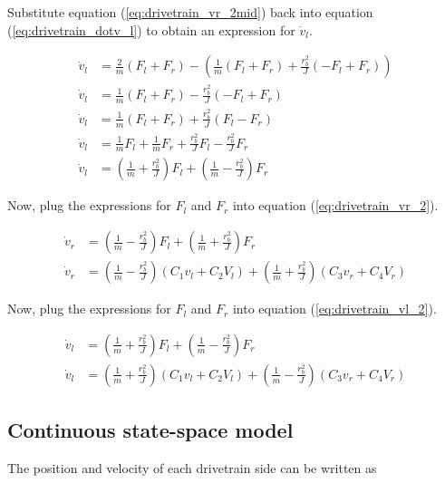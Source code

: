 Substitute equation (\ref{eq:drivetrain_vr_2mid}) back into equation
(\ref{eq:drivetrain_dotv_l}) to obtain an expression for $\dot{v}_l$.

\begin{align}
  \dot{v}_l &= \frac{2}{m} (F_l + F_r) - \left(\frac{1}{m} (F_l + F_r) +
    \frac{r_b^2}{J} (-F_l + F_r)\right) \nonumber \\
  \dot{v}_l &= \frac{1}{m} (F_l + F_r) - \frac{r_b^2}{J} (-F_l + F_r)
    \nonumber \\
  \dot{v}_l &= \frac{1}{m} (F_l + F_r) + \frac{r_b^2}{J} (F_l - F_r) \nonumber
    \\
  \dot{v}_l &= \frac{1}{m} F_l + \frac{1}{m} F_r + \frac{r_b^2}{J} F_l -
    \frac{r_b^2}{J} F_r \nonumber \\
  \dot{v}_l &= \left(\frac{1}{m} + \frac{r_b^2}{J}\right) F_l +
    \left(\frac{1}{m} - \frac{r_b^2}{J}\right) F_r \label{eq:drivetrain_vl_2}
\end{align}

Now, plug the expressions for $F_l$ and $F_r$ into equation
(\ref{eq:drivetrain_vr_2}).

\begin{align}
  \dot{v}_r &= \left(\frac{1}{m} - \frac{r_b^2}{J}\right) F_l +
    \left(\frac{1}{m} + \frac{r_b^2}{J}\right) F_r \nonumber \\
  \dot{v}_r &= \left(\frac{1}{m} - \frac{r_b^2}{J}\right)
    \left(C_1 v_l + C_2 V_l\right) +
    \left(\frac{1}{m} + \frac{r_b^2}{J}\right) \left(C_3 v_r + C_4 V_r\right)
    \label{eq:drivetrain_model_left}
\end{align}

Now, plug the expressions for $F_l$ and $F_r$ into equation
(\ref{eq:drivetrain_vl_2}).

\begin{align}
  \dot{v}_l &= \left(\frac{1}{m} + \frac{r_b^2}{J}\right) F_l +
    \left(\frac{1}{m} - \frac{r_b^2}{J}\right) F_r \nonumber \\
  \dot{v}_l &= \left(\frac{1}{m} + \frac{r_b^2}{J}\right)
    \left(C_1 v_l + C_2 V_l\right) +
    \left(\frac{1}{m} - \frac{r_b^2}{J}\right) \left(C_3 v_r + C_4 V_r\right)
    \label{eq:drivetrain_model_right}
\end{align}

\subsection{Continuous state-space model}

The position and velocity of each drivetrain side can be written as

